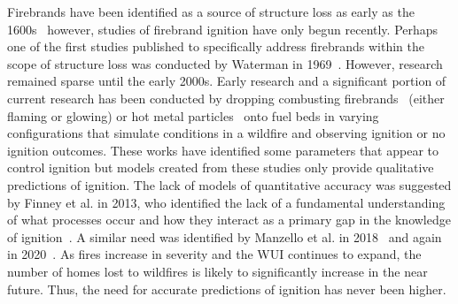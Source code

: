     
    Firebrands have been identified as a source of structure loss as early as the 1600s~\cite{Suzuki2020} however, studies of firebrand ignition have only begun recently. Perhaps one of the first studies published to specifically address firebrands within the scope of structure loss was conducted by Waterman in 1969~\cite{Waterman1969ExperiemntalGeneration}. However, research remained sparse until the early 2000s. Early research and a significant portion of current research has been conducted by dropping combusting firebrands~\cite{Ellis2011, Ellis2015, Ganteaume2009, Manzello2006, Manzello2006a} (either flaming or glowing) or hot metal particles~\cite{Wang2017, Urban2017, Fernandez-Pello2015, Hadden2011} onto fuel beds in varying configurations that simulate conditions in a wildfire and observing ignition or no ignition outcomes. These works have identified some parameters that appear to control ignition but models created from these studies only provide qualitative predictions of ignition. The lack of models of quantitative accuracy was suggested by Finney et al. in 2013, who identified the lack of a fundamental understanding of what processes occur and how they interact as a primary gap in the knowledge of ignition~\cite{Finney2013}. A similar need was identified by Manzello et al. in 2018~\cite{Manzello2018} and again in 2020~\cite{Manzello2020}. As fires increase in severity and the WUI continues to expand, the number of homes lost to wildfires is likely to significantly increase in the near future. Thus, the need for accurate predictions of ignition has never been higher. 
    
    
